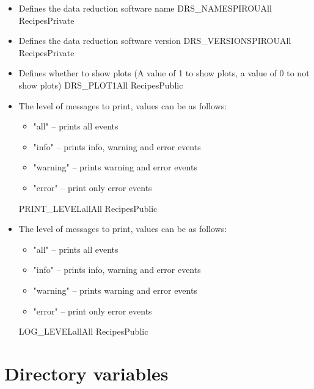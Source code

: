 \begin{itemize}
\ifdevguide
\item {}
{Defines the data reduction software name}
{DRS\_NAME}{SPIROU}{All Recipes}{\spirouCONST}{Private}
\fi

\ifdevguide
\item {}
{Defines the data reduction software version}
{DRS\_VERSION}{SPIROU}{All Recipes}{\spirouCONST}{Private}
\fi

\item {}
{Defines whether to show plots (A value of 1 to show plots, a value of 0 to not show plots)}
{DRS\_PLOT}{1}{All Recipes}{\configtxtfile}{Public}

\item {}
{The level of messages to print, values can be as follows:
\begin{itemize}
	\item "all" -- prints all events
	\item "info" -- prints info, warning and error events
	\item "warning" -- prints warning and error events
	\item "error" -- print only error events
\end{itemize}
}
{PRINT\_LEVEL}{all}{All Recipes}{\configtxtfile}{Public}

\item {}
{The level of messages to print, values can be as follows:
\begin{itemize}
	\item "all" -- prints all events
	\item "info" -- prints info, warning and error events
	\item "warning" -- prints warning and error events
	\item "error" -- print only error events
\end{itemize}
}
{LOG\_LEVEL}{all}{All Recipes}{\configtxtfile}{Public}


\end{itemize}


\section{Directory variables}
\label{ch:variables:directory}

